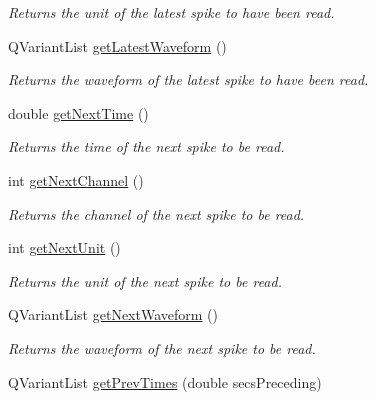 \begin{DoxyCompactItemize}
\begin{DoxyCompactList}\small\item\em Returns the unit of the latest spike to have been read. \end{DoxyCompactList}\item 
\hypertarget{class_picto_1_1_analysis_spike_data_a5173e408255345fe1a1e431550420667}{Q\-Variant\-List \hyperlink{class_picto_1_1_analysis_spike_data_a5173e408255345fe1a1e431550420667}{get\-Latest\-Waveform} ()}\label{class_picto_1_1_analysis_spike_data_a5173e408255345fe1a1e431550420667}

\begin{DoxyCompactList}\small\item\em Returns the waveform of the latest spike to have been read. \end{DoxyCompactList}\item 
double \hyperlink{class_picto_1_1_analysis_spike_data_a58f2959ebf238883e915ec4c38eb6ded}{get\-Next\-Time} ()
\begin{DoxyCompactList}\small\item\em Returns the time of the next spike to be read. \end{DoxyCompactList}\item 
int \hyperlink{class_picto_1_1_analysis_spike_data_aad435cb283f849d2be2fd68bafee9c53}{get\-Next\-Channel} ()
\begin{DoxyCompactList}\small\item\em Returns the channel of the next spike to be read. \end{DoxyCompactList}\item 
int \hyperlink{class_picto_1_1_analysis_spike_data_a14c0cc4adf0191c401be4ca6e4d07f2c}{get\-Next\-Unit} ()
\begin{DoxyCompactList}\small\item\em Returns the unit of the next spike to be read. \end{DoxyCompactList}\item 
Q\-Variant\-List \hyperlink{class_picto_1_1_analysis_spike_data_a811fee6896b5e6493652a03e7e740908}{get\-Next\-Waveform} ()
\begin{DoxyCompactList}\small\item\em Returns the waveform of the next spike to be read. \end{DoxyCompactList}\item 
\hypertarget{class_picto_1_1_analysis_spike_data_a486d3e1e4eb7989b7cde62012b55a7dd}{Q\-Variant\-List \hyperlink{class_picto_1_1_analysis_spike_data_a486d3e1e4eb7989b7cde62012b55a7dd}{get\-Prev\-Times} (double secs\-Preceding)}\label{class_picto_1_1_analysis_spike_data_a486d3e1e4eb7989b7cde62012b55a7dd}


\end{DoxyCompactItemize}
